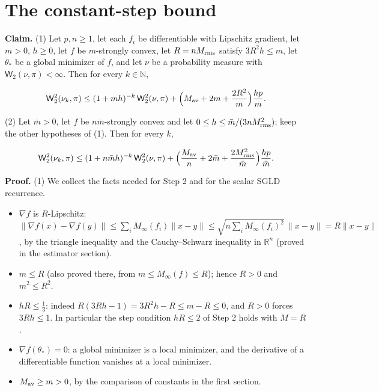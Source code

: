 \documentclass[11pt,a4paper]{article}
\begin{document}
\section{\texorpdfstring{The constant-step bound}{The constant-step bound}}


\textbf{Claim.} (1) Let \(p,n\ge1\), let each \(f_i\) be differentiable with Lipschitz gradient, let \(m>0\), \(h\ge0\), let \(f\) be \(m\)-strongly convex, let \(R=nM_{\rm rms}\) satisfy \(3R^2h\le m\), let \(\theta_*\) be a global minimizer of \(f\), and let \(\nu\) be a probability measure with \(\mathsf W_2(\nu,\pi)<\infty\). Then for every \(k\in\mathbb N\),


\[\mathsf W_2^2(\nu_k,\pi)\le(1+mh)^{-k}\,\mathsf W_2^2(\nu,\pi)+\Bigl(M_{\rm av}+2m+\frac{2R^2}m\Bigr)\frac{hp}m.\]


(2) Let \(\bar m>0\), let \(f\) be \(n\bar m\)-strongly convex and let \(0\le h\le\bar m/(3nM_{\rm rms}^2)\); keep the other hypotheses of (1). Then for every \(k\),


\[\mathsf W_2^2(\nu_k,\pi)\le(1+n\bar mh)^{-k}\,\mathsf W_2^2(\nu,\pi)+\Bigl(\frac{M_{\rm av}}n+2\bar m+\frac{2M_{\rm rms}^2}{\bar m}\Bigr)\frac{hp}{\bar m}.\]


\textbf{Proof.} (1) We collect the facts needed for Step 2 and for the scalar SGLD recurrence.



\begin{itemize}


\item \(\nabla f\) is \(R\)-Lipschitz: \(\|\nabla f(x)-\nabla f(y)\|\le\sum_iM_\infty(f_i)\|x-y\|\le\sqrt{n\sum_iM_\infty(f_i)^2}\,\|x-y\|=R\|x-y\|\), by the triangle inequality and the Cauchy–Schwarz inequality in \(\mathbb R^n\) (proved in the estimator section).

\item \(m\le R\) (also proved there, from \(m\le M_\infty(f)\le R\)); hence \(R>0\) and \(m^2\le R^2\).

\item \(hR\le\frac13\): indeed \(R(3Rh-1)=3R^2h-R\le m-R\le0\), and \(R>0\) forces \(3Rh\le1\). In particular the step condition \(hR\le2\) of Step 2 holds with \(M=R\).

\item \(\nabla f(\theta_*)=0\): a global minimizer is a local minimizer, and the derivative of a differentiable function vanishes at a local minimizer.

\item \(M_{\rm av}\ge m>0\), by the comparison of constants in the first section.

\end{itemize}
\end{document}
